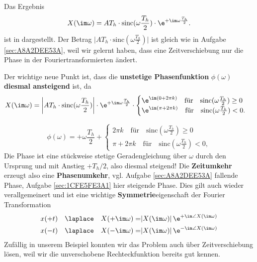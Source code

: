 \begin{Loesung}
Das Ergebnis
\begin{equation}
\label{eq:1CFE5FE3A1_Loesung}
X(\im \omega) = A T_h \cdot \mathrm{sinc}(\omega\frac{T_h}{2}) \cdot  \e^{+\im\omega\frac{T_h}{2}}.
\end{equation}
ist in  dargestellt. Der Betrag
$\bigg|A T_h \cdot \mathrm{sinc}(\omega\frac{T_h}{2})\bigg|$
ist gleich wie in Aufgabe \ref{sec:A8A2DEE53A}, weil wir gelernt haben, dass
eine Zeitverschiebung nur die Phase in der Fouriertransformierten ändert.
%

Der wichtige neue Punkt ist, dass die \textbf{unstetige Phasenfunktion} $\phi(\omega)$
\textbf{diesmal ansteigend} ist,  da
\begin{equation}
X(\im \omega) = \bigg|A T_h \cdot \mathrm{sinc}(\omega\frac{T_h}{2})\bigg|
\cdot  \e^{+\im\omega\frac{T_h}{2}}\cdot
\begin{cases}
\e^{\im (0+2\pi k)}\quad \text{für}\quad \mathrm{sinc}(\omega\frac{T_h}{2})\geq0\\
\e^{\im (\pi + 2\pi k)}\quad \text{für}\quad\mathrm{sinc}(\omega\frac{T_h}{2})<0.
\end{cases}
\end{equation}

\begin{equation}
\phi(\omega) = +\omega\frac{T_h}{2} +
\begin{cases}
2\pi k\quad \text{für}\quad \mathrm{sinc}(\omega\frac{T_h}{2})\geq0\\
\pi + 2\pi k\quad \text{für}\quad\mathrm{sinc}(\omega\frac{T_h}{2})<0,
\end{cases}
\end{equation}
Die Phase ist eine stückweise stetige Geradengleichung über $\omega$ durch den
Ursprung und mit Anstieg $+T_h/2$, also diesmal steigend!
%
Die \textbf{Zeitumkehr} erzeugt also eine \textbf{Phasenumkehr}, vgl.
Aufgabe \ref{sec:A8A2DEE53A} fallende Phase, Aufgabe \ref{sec:1CFE5FE3A1} hier steigende Phase.
%
Dies gilt auch wieder verallgemeinert und ist eine wichtige \textbf{Symmetrie}eigenschaft
der Fourier Transformation
%
\begin{align}
x(+t) \quad \laplace \quad X(+\im\omega) =& |X(\im\omega)| \, \e^{+\im\angle X(\im\omega)}\\
x(-t) \quad \laplace \quad X(-\im\omega) =& |X(\im\omega)| \, \e^{-\im\angle X(\im\omega)}
\end{align}
%
Zufällig in unserem Beispiel konnten wir das Problem auch über Zeitverschiebung
lösen, weil wir die unverschobene Rechteckfunktion bereits gut kennen.
\end{Loesung}
